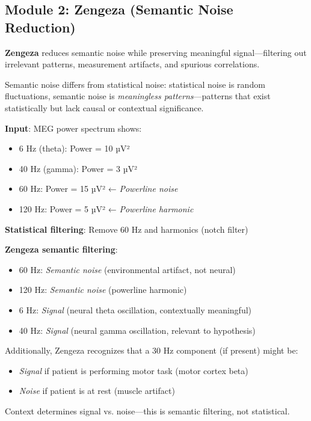 \subsection{Module 2: Zengeza (Semantic Noise Reduction)}

\begin{definition}
\textbf{Zengeza} reduces semantic noise while preserving meaningful signal—filtering out irrelevant patterns, measurement artifacts, and spurious correlations.
\end{definition}

\begin{theorem}
Semantic noise differs from statistical noise: statistical noise is random fluctuations, semantic noise is \textit{meaningless patterns}—patterns that exist statistically but lack causal or contextual significance.
\end{theorem}

\begin{example}
\textbf{Input}: MEG power spectrum shows:
\begin{itemize}
\item 6 Hz (theta): Power = 10 µV²
\item 40 Hz (gamma): Power = 3 µV²
\item 60 Hz: Power = 15 µV² ← \textit{Powerline noise}
\item 120 Hz: Power = 5 µV² ← \textit{Powerline harmonic}
\end{itemize}

\textbf{Statistical filtering}: Remove 60 Hz and harmonics (notch filter)

\textbf{Zengeza semantic filtering}:
\begin{itemize}
\item 60 Hz: \textit{Semantic noise} (environmental artifact, not neural)
\item 120 Hz: \textit{Semantic noise} (powerline harmonic)
\item 6 Hz: \textit{Signal} (neural theta oscillation, contextually meaningful)
\item 40 Hz: \textit{Signal} (neural gamma oscillation, relevant to hypothesis)
\end{itemize}

Additionally, Zengeza recognizes that a 30 Hz component (if present) might be:
\begin{itemize}
\item \textit{Signal} if patient is performing motor task (motor cortex beta)
\item \textit{Noise} if patient is at rest (muscle artifact)
\end{itemize}

Context determines signal vs. noise—this is semantic filtering, not statistical.
\end{example}


